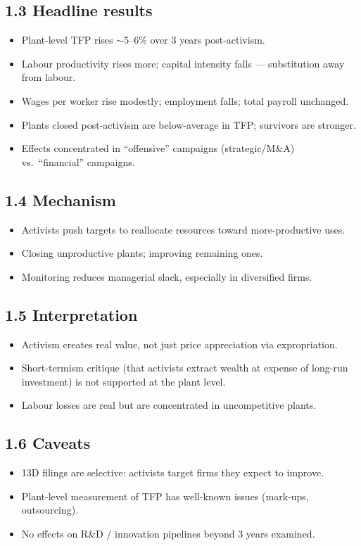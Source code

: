 \documentclass[11pt]{article}
\begin{document}
\subsection*{1.3 Headline results}
\begin{itemize}
\item Plant-level TFP rises $\sim$5--6\% over 3 years post-activism.
\item Labour productivity rises more; capital intensity falls --- substitution away from labour.
\item Wages per worker rise modestly; employment falls; total payroll unchanged.
\item Plants closed post-activism are below-average in TFP; survivors are stronger.
\item Effects concentrated in ``offensive'' campaigns (strategic/M\&A) vs.\ ``financial'' campaigns.
\end{itemize}

\subsection*{1.4 Mechanism}
\begin{itemize}
\item Activists push targets to reallocate resources toward more-productive uses.
\item Closing unproductive plants; improving remaining ones.
\item Monitoring reduces managerial slack, especially in diversified firms.
\end{itemize}

\subsection*{1.5 Interpretation}
\begin{itemize}
\item Activism creates real value, not just price appreciation via expropriation.
\item Short-termism critique (that activists extract wealth at expense of long-run investment) is not supported at the plant level.
\item Labour losses are real but are concentrated in uncompetitive plants.
\end{itemize}

\subsection*{1.6 Caveats}
\begin{alertbox}
\begin{itemize}
\item 13D filings are selective: activists target firms they expect to improve.
\item Plant-level measurement of TFP has well-known issues (mark-ups, outsourcing).
\item No effects on R\&D / innovation pipelines beyond 3 years examined.
\end{itemize}
\end{alertbox}
\end{document}
